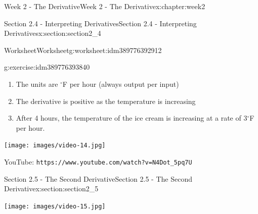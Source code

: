 \documentclass[oneside,10pt,]{book}
\newcommand{\mono}[1]{\texttt{#1}}
\numberwithin{equation}{section}
\newlength{\qrsize}
\newlength{\previewwidth}
\begin{document}
\begin{chapterptx}{Week 2 - The Derivative}{}{Week 2 - The Derivative}{}{}{x:chapter:week2}
\begin{sectionptx}{Section 2.4 - Interpreting Derivatives}{}{Section 2.4 - Interpreting Derivatives}{}{}{x:section:section2_4}
\begin{worksheet-subsection}{Worksheet}{}{Worksheet}{}{}{g:worksheet:idm389776392912}
\begin{divisionexercise}{1}{}{}{g:exercise:idm389776393840}
\begin{enumerate}[label=(\alph*)]
\begin{image}{0}{1}{0}
\end{image}%
%
\item{}The units are \(^\circ\)F per hour (always output per input)%
\item{}The derivative is positive as the temperature is increasing%
\item{}After 4 hours, the temperature of the ice cream is increasing at a rate of 3\(^\circ\)F per hour.%
\end{enumerate}
\end{divisionexercise}%
\end{worksheet-subsection}
\restoregeometry
\setlength{\qrsize}{9em}
\setlength{\previewwidth}{\linewidth}
\addtolength{\previewwidth}{-\qrsize}
\begin{tcbraster}[raster columns=2, raster column skip=1pt, raster halign=center, raster force size=false, raster left skip=0pt, raster right skip=0pt]%
\begin{tcolorbox}[previewstyle, width=\previewwidth]%
\texttt{[image: images/video-14.jpg]}%
\end{tcolorbox}%
\begin{tcolorbox}[qrstyle]%
{\hypersetup{urlcolor=black}}%
\end{tcolorbox}%
\begin{tcolorbox}[captionstyle]%
\small YouTube: \mono{https://www.youtube.com/watch?v=N4Dot\_5pq7U}\end{tcolorbox}%
\end{tcbraster}%
\end{sectionptx}
%
%
\typeout{************************************************}
\typeout{************************************************}
%
\begin{sectionptx}{Section 2.5 - The Second Derivative}{}{Section 2.5 - The Second Derivative}{}{}{x:section:section2_5}
\setlength{\qrsize}{9em}
\setlength{\previewwidth}{\linewidth}
\addtolength{\previewwidth}{-\qrsize}
\begin{tcbraster}[raster columns=2, raster column skip=1pt, raster halign=center, raster force size=false, raster left skip=0pt, raster right skip=0pt]%
\begin{tcolorbox}[previewstyle, width=\previewwidth]%
\texttt{[image: images/video-15.jpg]}%
\end{tcolorbox}%
\begin{tcolorbox}[qrstyle]%
{\hypersetup{urlcolor=black}}%

\end{tcolorbox}
\end{tcbraster}
\end{sectionptx}
\end{chapterptx}
\end{document}
